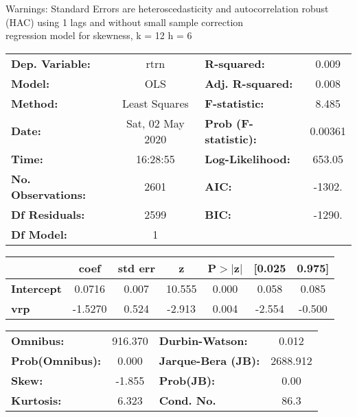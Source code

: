 Warnings: \newline
 [1] Standard Errors are heteroscedasticity and autocorrelation robust (HAC) using 1 lags and without small sample correction\\ 

regression model for skewness, k = 12 h = 6\begin{center}
\begin{tabular}{lclc}
\toprule
\textbf{Dep. Variable:}    &       rtrn       & \textbf{  R-squared:         } &     0.009   \\
\textbf{Model:}            &       OLS        & \textbf{  Adj. R-squared:    } &     0.008   \\
\textbf{Method:}           &  Least Squares   & \textbf{  F-statistic:       } &     8.485   \\
\textbf{Date:}             & Sat, 02 May 2020 & \textbf{  Prob (F-statistic):} &  0.00361    \\
\textbf{Time:}             &     16:28:55     & \textbf{  Log-Likelihood:    } &    653.05   \\
\textbf{No. Observations:} &        2601      & \textbf{  AIC:               } &    -1302.   \\
\textbf{Df Residuals:}     &        2599      & \textbf{  BIC:               } &    -1290.   \\
\textbf{Df Model:}         &           1      & \textbf{                     } &             \\
\bottomrule
\end{tabular}
\begin{tabular}{lcccccc}
                   & \textbf{coef} & \textbf{std err} & \textbf{z} & \textbf{P$> |$z$|$} & \textbf{[0.025} & \textbf{0.975]}  \\
\midrule
\textbf{Intercept} &       0.0716  &        0.007     &    10.555  &         0.000        &        0.058    &        0.085     \\
\textbf{vrp}       &      -1.5270  &        0.524     &    -2.913  &         0.004        &       -2.554    &       -0.500     \\
\bottomrule
\end{tabular}
\begin{tabular}{lclc}
\textbf{Omnibus:}       & 916.370 & \textbf{  Durbin-Watson:     } &    0.012  \\
\textbf{Prob(Omnibus):} &   0.000 & \textbf{  Jarque-Bera (JB):  } & 2688.912  \\
\textbf{Skew:}          &  -1.855 & \textbf{  Prob(JB):          } &     0.00  \\
\textbf{Kurtosis:}      &   6.323 & \textbf{  Cond. No.          } &     86.3  \\
\bottomrule
\end{tabular}
\end{center}

